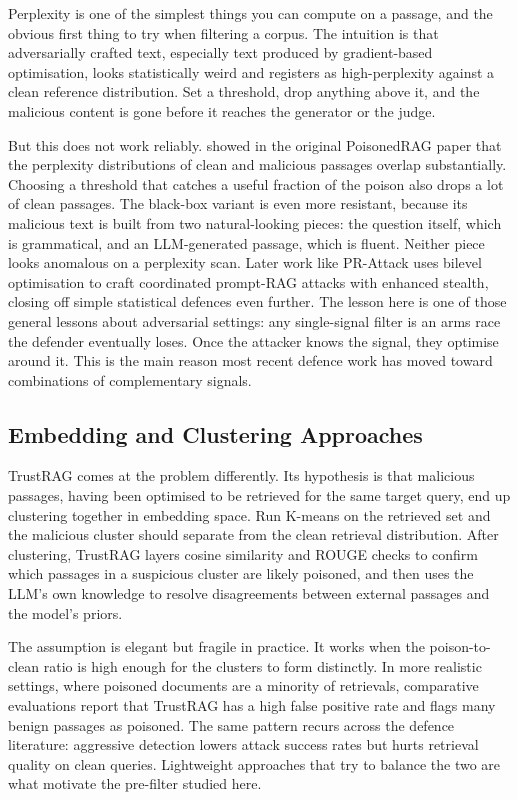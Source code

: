 Perplexity is one of the simplest things you can compute on a passage, and the obvious first thing to try when filtering a corpus. The intuition is that adversarially crafted text, especially text produced by gradient-based optimisation, looks statistically weird and registers as high-perplexity against a clean reference distribution. Set a threshold, drop anything above it, and the malicious content is gone before it reaches the generator or the judge.

But this does not work reliably. \citet{zou2025poisonedrag} showed in the original PoisonedRAG paper that the perplexity distributions of clean and malicious passages overlap substantially. Choosing a threshold that catches a useful fraction of the poison also drops a lot of clean passages. The black-box variant is even more resistant, because its malicious text is built from two natural-looking pieces: the question itself, which is grammatical, and an LLM-generated passage, which is fluent. Neither piece looks anomalous on a perplexity scan. Later work like PR-Attack \citep{jiao2025prattack} uses bilevel optimisation to craft coordinated prompt-RAG attacks with enhanced stealth, closing off simple statistical defences even further. The lesson here is one of those general lessons about adversarial settings: any single-signal filter is an arms race the defender eventually loses. Once the attacker knows the signal, they optimise around it. This is the main reason most recent defence work has moved toward combinations of complementary signals.

\subsection{Embedding and Clustering Approaches}

TrustRAG \citep{zhou2025trustrag} comes at the problem differently. Its hypothesis is that malicious passages, having been optimised to be retrieved for the same target query, end up clustering together in embedding space. Run K-means on the retrieved set and the malicious cluster should separate from the clean retrieval distribution. After clustering, TrustRAG layers cosine similarity and ROUGE checks to confirm which passages in a suspicious cluster are likely poisoned, and then uses the LLM's own knowledge to resolve disagreements between external passages and the model's priors.

The assumption is elegant but fragile in practice. It works when the poison-to-clean ratio is high enough for the clusters to form distinctly. In more realistic settings, where poisoned documents are a minority of retrievals, comparative evaluations report that TrustRAG has a high false positive rate and flags many benign passages as poisoned. The same pattern recurs across the defence literature: aggressive detection lowers attack success rates but hurts retrieval quality on clean queries. Lightweight approaches that try to balance the two are what motivate the pre-filter studied here.

